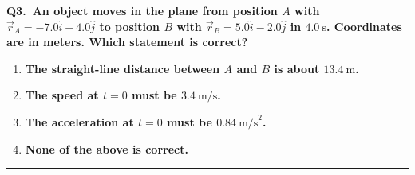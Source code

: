 \documentclass[11pt]{article}
\newcommand{\QuestionStyle}[1]{{\large\bfseries\boldmath #1}}
\newcommand{\AnswerStyle}[1]{{\large\bfseries\boldmath #1}}
\newcommand{\ReasonStyle}[1]{{\normalsize #1}}
\newif\ifshowreason
\newcommand{\Correct}[2]{%
  \item \AnswerStyle{\textcolor{AnsRed}{#1}}%
  \ifshowreason\\[-0.2em]
    \ReasonStyle{\textcolor{AnsRed}{#2}}%
  \fi
}
\newcommand{\Wrong}[2]{%
  \item \AnswerStyle{\textcolor{WrongBlue}{#1}}%
  \ifshowreason\\[-0.2em]
    \ReasonStyle{\textcolor{WrongBlue}{#2}}%
  \fi
}
\newcommand{\QBlock}[3]{%
  \Needspace{8\baselineskip}%
  \noindent
  \begin{minipage}{\linewidth}
    \QuestionStyle{#1.~#2}

    \vspace{0.25em}
    \begin{enumerate}
      #3
    \end{enumerate}

    \vspace{0.25em}
    \hrule height 0.4pt
  \end{minipage}
  \vspace{0.75em}
}
\begin{document}
\QBlock{Q3}{An object moves in the plane from position $A$ with $\vec r_A=-7.0\hat{i}+4.0\hat{j}$ to position $B$ with $\vec r_B=5.0\hat{i}-2.0\hat{j}$ in $4.0\ \text{s}$. Coordinates are in meters. Which statement is correct?}{
  \Correct{The straight-line distance between $A$ and $B$ is about $13.4\ \text{m}$.}{The displacement is $\Delta\vec r=\vec r_B-\vec r_A=(5-(-7))\hat i+(-2-4)\hat j=12\hat i-6\hat j$. Its magnitude is $|\Delta\vec r|=\sqrt{12^2+(-6)^2}=\sqrt{180}\approx 13.4\,\text{m}$, so this statement is correct.}
  \Wrong{The speed at $t=0$ must be $3.4\ \text{m/s}$.}{This assumes the initial speed must equal the average speed $|\Delta\vec r|/\Delta t$. With only start/end positions and total time, infinitely many motions are possible, so the initial speed is not uniquely determined.}
  \Wrong{The acceleration at $t=0$ must be $0.84\ \text{m/s}^2$.}{This effectively invents an acceleration using a relation like $a\sim |\Delta\vec r|/t^2$ without justification. Acceleration cannot be determined from just two position vectors and an elapsed time unless additional constraints (e.g., constant acceleration plus more information) are provided.}
  \Wrong{None of the above is correct.}{Option A is correct because the magnitude of the displacement between the two given coordinates is about $13.4\,\text{m}$. Therefore it is not true that none of the statements is correct.}
}
\end{document}
